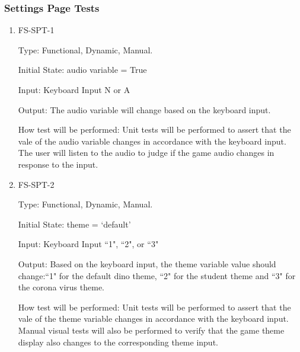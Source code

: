 \documentclass[12pt, titlepage]{article}
\begin{document}
	\subsubsection{Settings Page Tests}
	
	\begin{enumerate}
		
		\item{FS-SPT-1\\}
		
		Type: Functional, Dynamic, Manual.
		
		Initial State: audio variable = True
		
		Input: Keyboard Input N or A 
		
		Output: The audio variable will change based on the keyboard input. 
		
		How test will be performed: Unit tests will be performed to assert that the vale of the audio variable changes in accordance with the keyboard input. The user will listen to the audio to judge if the game audio changes in response to the input.
		
		
		
		\item{FS-SPT-2\\}
		
		Type: Functional, Dynamic, Manual.
		
		Initial State: theme = `default'
		
		Input: Keyboard Input ``1", ``2", or ``3"
		
		Output: Based on the keyboard input, the theme variable value should change:``1" for the default dino theme, ``2" for the student theme and ``3" for the corona virus theme.
		
		How test will be performed: Unit tests will be performed to assert that the vale of the theme variable changes in accordance with the keyboard input.
		Manual visual tests will also be performed to verify that the game theme display also changes to the corresponding theme input.
		
		
		

\end{enumerate}
\end{document}
